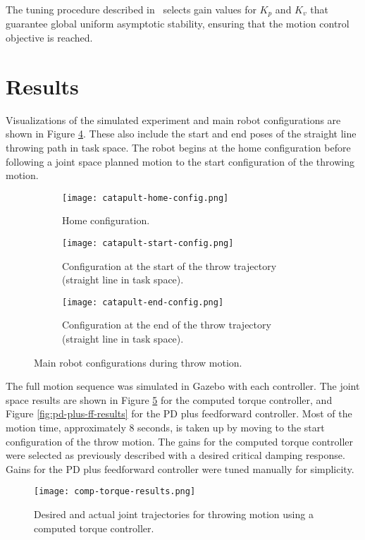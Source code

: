 \documentclass[conference]{IEEEtran}
\begin{document}
The tuning procedure described in~\cite{kelly2007control} selects gain values for $K_p$
and $K_v$ that guarantee global uniform asymptotic stability, ensuring that the
motion control objective is reached.


\section{Results}
Visualizations of the simulated experiment and main robot configurations are
shown in Figure \ref{fig:configs}. These also include the start and end poses of
the straight line throwing path in task space. The robot begins at the home
configuration before following a joint space planned motion to the start
configuration of the throwing motion.

\begin{figure}[!t]
  \begin{subfigure}{0.24\textwidth}
    \texttt{[image: catapult-home-config.png]}
    \caption{Home configuration.}
    \label{fig:home-config}
  \end{subfigure}
  \begin{subfigure}{0.24\textwidth}
    \texttt{[image: catapult-start-config.png]}
    \caption{Configuration at the start of the throw trajectory (straight line in task space).}
    \label{fig:start-config}
  \end{subfigure}
  \begin{subfigure}{0.24\textwidth}
    \texttt{[image: catapult-end-config.png]}
    \caption{Configuration at the end of the throw trajectory (straight line in task space).}
    \label{fig:end-config}
  \end{subfigure}
  \caption{Main robot configurations during throw motion.}
  \label{fig:configs}
\end{figure}

The full motion sequence was simulated in Gazebo with each controller. The joint
space results are shown in Figure \ref{fig:comp-torque-results} for the computed
torque controller, and Figure \ref{fig:pd-plus-ff-results} for the PD plus
feedforward controller. Most of the motion time, approximately $8$ seconds, is
taken up by moving to the start configuration of the throw motion. The gains for
the computed torque controller were selected as previously described with a
desired critical damping response. Gains for the PD plus feedforward controller
were tuned manually for simplicity.

\begin{figure}[!t]
  \texttt{[image: comp-torque-results.png]}
  \caption{Desired and actual joint trajectories for throwing motion using a computed torque controller.}
  \label{fig:comp-torque-results}
\end{figure}
\end{document}
